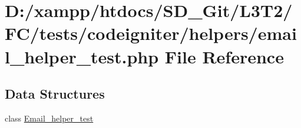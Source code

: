 \hypertarget{email__helper__test_8php}{}\section{D\+:/xampp/htdocs/\+S\+D\+\_\+\+Git/\+L3\+T2/\+F\+C/tests/codeigniter/helpers/email\+\_\+helper\+\_\+test.php File Reference}
\label{email__helper__test_8php}
\subsection*{Data Structures}
\begin{DoxyCompactItemize}
\item 
class \hyperlink{class_email__helper__test}{Email\+\_\+helper\+\_\+test}
\end{DoxyCompactItemize}
